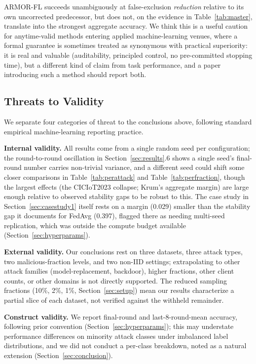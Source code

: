 \documentclass[pdflatex,iicol,sn-mathphys-num]{sn-jnl}%
\theoremstyle{thmstyleone}%
\theoremstyle{thmstyletwo}%
\theoremstyle{thmstylethree}%
\begin{document}
ARMOR-FL succeeds unambiguously at false-exclusion \emph{reduction} relative to its own uncorrected predecessor, but does not, on the evidence in Table~\ref{tab:master}, translate into the strongest aggregate accuracy. We think this is a useful caution for anytime-valid methods entering applied machine-learning venues, where a formal guarantee is sometimes treated as synonymous with practical superiority: it is real and valuable (auditability, principled control, no pre-committed stopping time), but a different kind of claim from task performance, and a paper introducing such a method should report both.

\subsection{Threats to Validity}\label{sec:threats}

We separate four categories of threat to the conclusions above, following standard empirical machine-learning reporting practice.

\textbf{Internal validity.} All results come from a single random seed per configuration; the round-to-round oscillation in Section~\ref{sec:results}.6 shows a single seed's final-round number carries non-trivial variance, and a different seed could shift some closer comparisons in Table~\ref{tab:perattack} and Table~\ref{tab:perfraction}, though the largest effects (the CICIoT2023 collapse; Krum's aggregate margin) are large enough relative to observed stability gaps to be robust to this. The case study in Section~\ref{sec:casestudy1} itself rests on a margin (0.029) smaller than the stability gap it documents for FedAvg (0.397), flagged there as needing multi-seed replication, which was outside the compute budget available (Section~\ref{sec:hyperparams}).

\textbf{External validity.} Our conclusions rest on three datasets, three attack types, two malicious-fraction levels, and two non-IID settings; extrapolating to other attack families (model-replacement, backdoor), higher fractions, other client counts, or other domains is not directly supported. The reduced sampling fractions (10\%, 2\%, 1\%, Section~\ref{sec:setup}) mean our results characterize a partial slice of each dataset, not verified against the withheld remainder.

\textbf{Construct validity.} We report final-round and last-8-round-mean accuracy, following prior convention (Section~\ref{sec:hyperparams}); this may understate performance differences on minority attack classes under imbalanced label distributions, and we did not conduct a per-class breakdown, noted as a natural extension (Section~\ref{sec:conclusion}).
\end{document}
